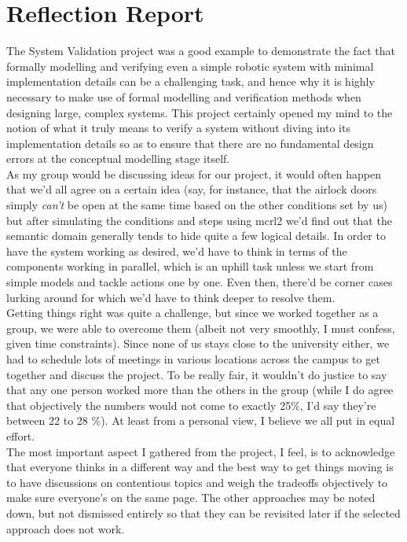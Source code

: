 \documentclass[]{report}
\title{}
\author{Aniket Ashwin Samant}
\begin{document}
\section*{Reflection Report}
The System Validation project was a good example to demonstrate the fact that formally modelling and verifying even a simple robotic system with minimal implementation details can be a challenging task, and hence why it is highly necessary to make use of formal modelling and verification methods when designing large, complex systems. This project certainly opened my mind to the notion of what it truly means to verify a system without diving into its implementation details so as to ensure that there are no fundamental design errors at the conceptual modelling stage itself.\\

As my group would be discussing ideas for our project, it would often happen that we'd all agree on a certain idea (say, for instance, that the airlock doors simply \textit{can't} be open at the same time based on the other conditions set by us) but after simulating the conditions and steps using mcrl2 we'd find out that the semantic domain generally tends to hide quite a few logical details. In order to have the system working as desired, we'd have to think in terms of the components working in parallel, which is an uphill task unless we start from simple models and tackle actions one by one. Even then, there'd be corner cases lurking around for which we'd have to think deeper to resolve them.\\

Getting things right was quite a challenge, but since we worked together as a group, we were able to overcome them (albeit not very smoothly, I must confess, given time constraints). Since none of us stays close to the university either, we had to schedule lots of meetings in various locations across the campus to get together and discuss the project. To be really fair, it wouldn't do justice to say that any one person worked more than the others in the group (while I do agree that objectively the numbers would not come to exactly 25$\%$, I'd say they're between 22 to 28 $\%$). At least from a personal view, I believe we all put in equal effort.\\

The most important aspect I gathered from the project, I feel, is to acknowledge that everyone thinks in a different way and the best way to get things moving is to have discussions on contentious topics and weigh the tradeoffs objectively to make sure everyone's on the same page. The other approaches may be noted down, but not dismissed entirely so that they can be revisited later if the selected approach does not work.\\
\end{document}

